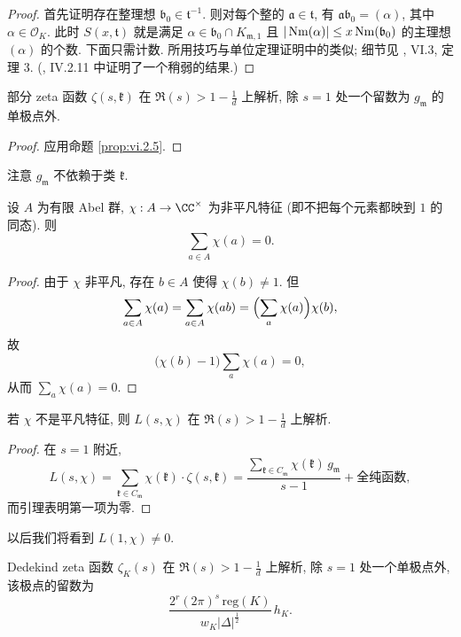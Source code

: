 \begin{proof}
首先证明存在整理想 $\mathfrak{b}_0\in\mathfrak{t}^{-1}$. 则对每个整的 $\mathfrak{a}\in\mathfrak{t}$, 有 $\mathfrak{a}\mathfrak{b}_0=(\alpha)$, 其中 $\alpha\in\mathcal{O}_K$. 此时 $S(x,\mathfrak{t})$ 就是满足 $\alpha\in\mathfrak{b}_0\cap K_{\mathfrak{m},1}$ 且 $|\operatorname{Nm}(\alpha)|\le x\operatorname{Nm}(\mathfrak{b}_0)$ 的主理想 $(\alpha)$ 的个数. 下面只需计数. 所用技巧与单位定理证明中的类似; 细节见 \cite{Lang1970}, VI.3, 定理 3. (\cite{Janusz1996}, IV.2.11 中证明了一个稍弱的结果.)
\end{proof}

\begin{corollary}\label{cor:vi.2.9}
部分 zeta 函数 $\zeta(s,\mathfrak{k})$ 在 $\Re(s)>1-\frac{1}{d}$ 上解析, 除 $s=1$ 处一个留数为 $g_{\mathfrak{m}}$ 的单极点外.
\end{corollary}

\begin{proof}
应用命题 \ref{prop:vi.2.5}.
\end{proof}

注意 $g_{\mathfrak{m}}$ 不依赖于类 $\mathfrak{k}$.

\begin{lemma}\label{lem:vi.2.10}
设 $A$ 为有限 Abel 群, $\chi:A\to\CC^{\times}$ 为非平凡特征 (即不把每个元素都映到 $1$ 的同态). 则
\[
\sum_{a\in A}\chi(a)=0.
\]
\end{lemma}

\begin{proof}
由于 $\chi$ 非平凡, 存在 $b\in A$ 使得 $\chi(b)\ne1$. 但
\[
\sum_{a\in A}\chi(a)=\sum_{a\in A}\chi(ab)=\Bigl(\sum_{a}\chi(a)\Bigr)\chi(b),
\]
故
\[
\bigl(\chi(b)-1\bigr)\sum_{a}\chi(a)=0,
\]
从而 $\sum_{a}\chi(a)=0$.
\end{proof}

\begin{corollary}\label{cor:vi.2.11}
若 $\chi$ 不是平凡特征, 则 $L(s,\chi)$ 在 $\Re(s)>1-\frac{1}{d}$ 上解析.
\end{corollary}

\begin{proof}
在 $s=1$ 附近,
\[
L(s,\chi)=\sum_{\mathfrak{k}\in C_{\mathfrak{m}}}\chi(\mathfrak{k})\cdot\zeta(s,\mathfrak{k})=\frac{\sum_{\mathfrak{k}\in C_{\mathfrak{m}}}\chi(\mathfrak{k})\,g_{\mathfrak{m}}}{s-1}+\text{全纯函数},
\]
而引理表明第一项为零.
\end{proof}

以后我们将看到 $L(1,\chi)\ne0$.

\begin{corollary}\label{cor:vi.2.12}
Dedekind zeta 函数 $\zeta_K(s)$ 在 $\Re(s)>1-\frac{1}{d}$ 上解析, 除 $s=1$ 处一个单极点外, 该极点的留数为
\[
\frac{2^{r}(2\pi)^{s}\,\mathrm{reg}(K)}{w_{K}|\Delta|^{\frac{1}{2}}}\,h_{K}.
\]
\end{corollary}

